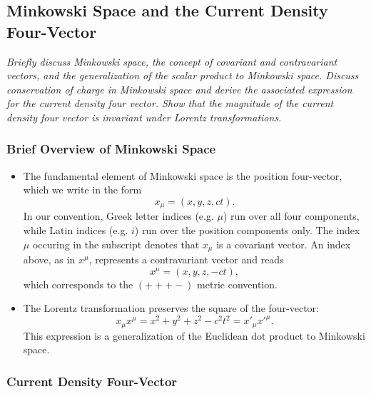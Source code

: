 \documentclass[11pt, a4paper]{article}
\begin{document}
    
\subsection{Minkowski Space and the Current Density Four-Vector}
\textit{Briefly discuss Minkowski space, the concept of covariant and contravariant vectors, and the generalization of the scalar product to Minkowski space. Discuss conservation of charge in Minkowski space and derive the associated expression for the current density four vector. Show that the magnitude of the current density four vector is invariant under Lorentz transformations.}

\subsubsection{Brief Overview of Minkowski Space}
\begin{itemize}

	\item The fundamental element of Minkowski space is the position four-vector, which we write in the form
	\begin{equation*}
		x_{\mu} = (x, y, z, ct).
	\end{equation*}
    In our convention, Greek letter indices (e.g. $ \mu $) run over all four components, while Latin indices (e.g. $ i $) run over the position components only. The index $ \mu $ occuring in the subscript denotes that $ x_{\mu} $ is a covariant vector. An index above, as in $ x^{\mu} $, represents a contravariant vector and reads
	\begin{equation*}
		x^{\mu} = (x, y, z, -ct),
	\end{equation*}
    which corresponds to the $ (+++-) $ metric convention.

	\item The Lorentz transformation preserves the square of the four-vector:
	\begin{equation*}
		x_{\mu}x^{\mu} = x^{2} + y^{2} + z^{2} - c^{2}t^{2} = x'_{\mu} x'^{\mu}.
	\end{equation*}
    This expression is a generalization of the Euclidean dot product to Minkowski space.

\end{itemize}

\subsubsection{Current Density Four-Vector}
\end{document}
